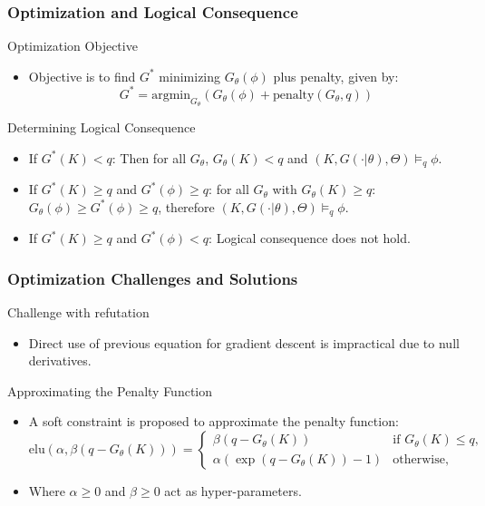 \documentclass{beamer}
\begin{document}
\begin{frame}
\frametitle{Optimization and Logical Consequence}
\begin{block}{Optimization Objective}
\begin{itemize}
    \item Objective is to find \( G^* \) minimizing \( G_\theta(\phi) \) plus penalty, given by:
    \[ G^* = \text{argmin}_{G_\theta} \left( G_\theta(\phi) + \text{penalty}(G_\theta, q) \right) \]
\end{itemize}
\end{block}

\begin{block}{Determining Logical Consequence}
\begin{itemize}
    \item If \( G^*(K) < q \): Then for all \( G_\theta \), \( G_\theta(K) < q \) and \( (K, G(\cdot | \theta), \Theta) \models_q \phi \).
    \item If \( G^*(K) \geq q \) and \( G^*(\phi) \geq q \): for all
      $G_\theta$ with $G_\theta(K) \geq q$: $G_\theta(\phi) \geq
      G^*(\phi) \geq q$, therefore $(K, G(\cdot | \theta), \Theta)
      \models_q \phi$.
    \item If \( G^*(K) \geq q \) and \( G^*(\phi) < q \): Logical consequence does not hold.
\end{itemize}
\end{block}
\end{frame}

\begin{frame}
\frametitle{Optimization Challenges and Solutions}
\begin{block}{Challenge with refutation}
\begin{itemize}
    \item Direct use of previous equation for gradient descent is
      impractical due to null derivatives.
\end{itemize}
\end{block}

\begin{block}{Approximating the Penalty Function}
\begin{itemize}
    \item A soft constraint is proposed to approximate the penalty function:
    \[ \text{elu}(\alpha, \beta(q - G_\theta(K))) = 
    \begin{cases} 
    \beta(q - G_\theta(K)) & \text{if } G_\theta(K) \leq q, \\
    \alpha(\exp(q-G_\theta(K)) - 1) & \text{otherwise},
    \end{cases} \]
    \item Where \( \alpha \geq 0 \) and \( \beta \geq 0 \) act as hyper-parameters.
\end{itemize}
\end{block}
\end{frame}
\end{document}
